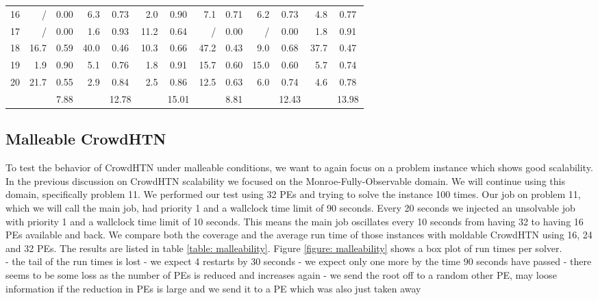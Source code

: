 \begin{table}
\begin{tabular}{|l|rc|rc|rc|rc|rc|rc|}
		16 & / & 0.00 & 6.3 & 0.73 & 2.0 & 0.90 & 7.1 & 0.71 & 6.2 & 0.73 & 4.8 & 0.77\\
		17 & / & 0.00 & 1.6 & 0.93 & 11.2 & 0.64 & / & 0.00 & / & 0.00 & 1.8 & 0.91\\
		18 & 16.7 & 0.59 & 40.0 & 0.46 & 10.3 & 0.66 & 47.2 & 0.43 & 9.0 & 0.68 & 37.7 & 0.47\\
		19 & 1.9 & 0.90 & 5.1 & 0.76 & 1.8 & 0.91 & 15.7 & 0.60 & 15.0 & 0.60 & 5.7 & 0.74\\
		20 & 21.7 & 0.55 & 2.9 & 0.84 & 2.5 & 0.86 & 12.5 & 0.63 & 6.0 & 0.74 & 4.6 & 0.78\\
		\hline
		& & 7.88 & & 12.78 & & 15.01 & & 8.81 & & 12.43 & & 13.98\\
		\hline
	\end{tabular}
\end{table}

\subsection{Malleable CrowdHTN}
\label{eval: malleable}
To test the behavior of CrowdHTN under malleable conditions, we want to again focus on a problem instance which shows good scalability. In the previous discussion on CrowdHTN scalability we focused on the Monroe-Fully-Observable domain. We will continue using this domain, specifically problem 11. We performed our test using 32 PEs and trying to solve the instance 100 times. Our job on problem 11, which we will call the main job, had priority 1 and a wallclock time limit of 90 seconds. Every 20 seconds we injected an unsolvable job with priority 1 and a wallclock time limit of 10 seconds. This means the main job oscillates every 10 seconds from having 32 to having 16 PEs available and back. We compare both the coverage and the average run time of those instances with moldable CrowdHTN using 16, 24 and 32 PEs. The results are listed in table \ref{table: malleability}. Figure \ref{figure: malleability} shows a box plot of run times per solver. \\
- the tail of the run times is lost
- we expect 4 restarts by 30 seconds
- we expect only one more by the time 90 seconds have passed
- there seems to be some loss as the number of PEs is reduced and increases again
- we send the root off to a random other PE, may loose information if the reduction in PEs is large and we send it to a PE which was also just taken away

